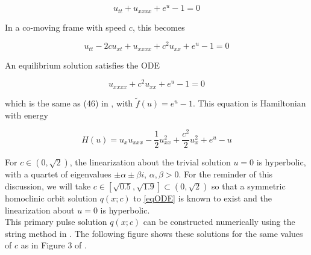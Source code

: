 \documentclass[12pt]{article}
\begin{document}
\begin{equation}\label{susp3}
u_{tt} + u_{xxxx} + e^{u} - 1 = 0
\end{equation}

In a co-moving frame with speed $c$, this becomes

\begin{equation}\label{suspc}
u_{tt} - 2 c u_{x t} + u_{xxxx} + c^2 u_{xx} + e^{u} - 1 = 0
\end{equation}

An equilibrium solution satisfies the ODE

\begin{equation}\label{eqODE}
u_{xxxx} + c^2 u_{xx} + e^{u} - 1 = 0
\end{equation}

which is the same as (46) in \cite{Chen1997}, with $\tilde{f}(u) = e^u - 1$. This equation is Hamiltonian with energy

\begin{equation}\label{eqH}
H(u) = u_x u_{xxx} - \frac{1}{2}u_{xx}^2 + \frac{c^2}{2}u_x^2 + e^u - u
\end{equation}

For $c \in (0, \sqrt{2})$, the linearization about the trivial solution $u = 0$ is hyperbolic, with a quartet of eigenvalues $\pm \alpha \pm \beta i$, $\alpha, \beta > 0$. For the reminder of this discussion, we will take $c \in [\sqrt{0.5}, \sqrt{1.9}] \subset (0, \sqrt{2})$ so that a symmetric homoclinic orbit solution $q(x; c)$ to \eqref{eqODE} is known to exist and the linearization about $u = 0$ is hyperbolic.\\

This primary pulse solution $q(x; c)$ can be constructed numerically using the string method in \cite{Chamard2011}. The following figure shows these solutions for the same values of $c$ as in Figure 3 of \cite{Chen1997}.
\end{document}
